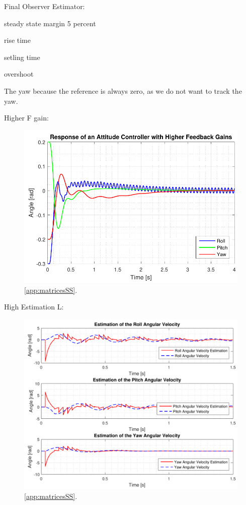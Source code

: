 Final Observer Estimator:

steady state margin 5 percent

rise time

setling time

overshoot

The yaw because the reference is always zero, as we do not want to track the yaw.


Higher F gain:

\begin{figure}[H]
	\centering
	\includegraphics[scale=1]{figures/ssEqBad.pdf}
	\caption{\autoref{app:matricesSS}.}
	\label{fig:TranslationalControlDiagram}
\end{figure}

High Estimation L:

\begin{figure}[H]
	\centering
	\includegraphics[scale=0.8]{figures/ssObsHigh.pdf}
	\caption{\autoref{app:matricesSS}.}
	\label{fig:TranslationalControlDiagram}
\end{figure}

